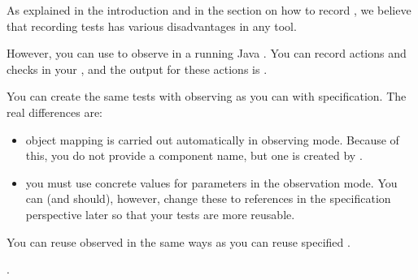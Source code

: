 
As explained in the introduction  and in the section on how to record , we believe that recording tests has various disadvantages in any tool. 

However, you can use \app{} to  observe \gdcases{} in a running Java \gdaut{}. You can record actions and checks in your \gdaut{}, and the output for these actions is \gdsteps{}. 

You can create the same tests with observing as you can with specification. The real differences are:
\begin{itemize}
\item object mapping is carried out automatically in observing mode. Because of this, you do not provide a component name, but one is created by \app{}. 
\item you must use concrete values for parameters in the observation mode. You can (and should), however, change these to references in the specification perspective later so that your tests are more reusable. 
\end{itemize}

You can reuse observed \gdcases{} in the same ways as you can reuse specified \gdcases{}. 

. 


     



